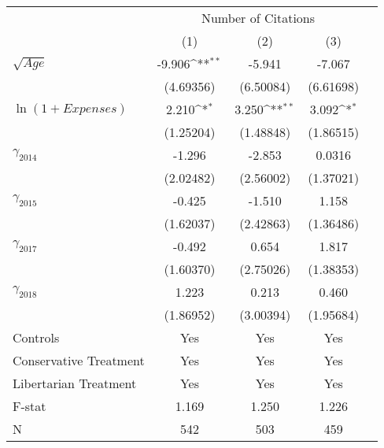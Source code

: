 \def\sym#1{\ifmmode^{#1}\else\(^{#1}\)\fi}
\setlength\tabcolsep{17pt}
\begin{tabular}{@{\extracolsep{7pt}}lcccc}
\toprule
                    &\multicolumn{3}{c}{Number of Citations}                          \\\cmidrule(lr){2-4}
                    &\multicolumn{1}{c}{(1)}         &\multicolumn{1}{c}{(2)}         &\multicolumn{1}{c}{(3)}         \\
\midrule
$\sqrt{Age}$        &      -9.906\sym{**} &      -5.941         &      -7.067         \\
                    &   (4.69356)         &   (6.50084)         &   (6.61698)         \\
\addlinespace
\small $\ln(1+Expenses)$&       2.210\sym{*}  &       3.250\sym{**} &       3.092\sym{*}  \\
                    &   (1.25204)         &   (1.48848)         &   (1.86515)         \\
\addlinespace
\large $\gamma_{2014}$&      -1.296         &      -2.853         &      0.0316         \\
                    &   (2.02482)         &   (2.56002)         &   (1.37021)         \\
\addlinespace
\large $\gamma_{2015}$&      -0.425         &      -1.510         &       1.158         \\
                    &   (1.62037)         &   (2.42863)         &   (1.36486)         \\
\addlinespace
\large $\gamma_{2017}$&      -0.492         &       0.654         &       1.817         \\
                    &   (1.60370)         &   (2.75026)         &   (1.38353)         \\
\addlinespace
\large $\gamma_{2018}$&       1.223         &       0.213         &       0.460         \\
                    &   (1.86952)         &   (3.00394)         &   (1.95684)         \\
\midrule
Controls            &         Yes         &         Yes         &         Yes         \\
Conservative Treatment&         Yes         &         Yes         &         Yes         \\
Libertarian Treatment&         Yes         &         Yes         &         Yes         \\
F-stat              &       1.169         &       1.250         &       1.226         \\
N                   &         542         &         503         &         459         \\
\bottomrule
\end{tabular}
